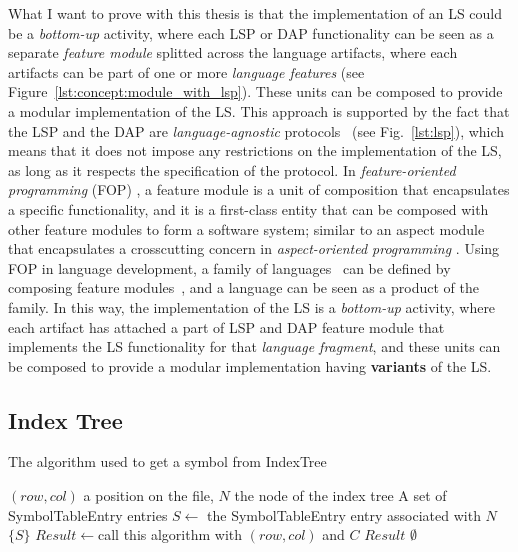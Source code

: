 What I want to prove with this thesis is that the implementation of an LS could be a \textit{bottom-up} activity, where each LSP or DAP functionality can be seen as a separate \textit{feature module} \cite{Batory04, Kastner11} splitted across the language artifacts, where each artifacts can be part of one or more \textit{language features} (see Figure~\ref{lst:concept:module_with_lsp}). These units can be composed to provide a modular implementation of the LS. This approach is supported by the fact that the LSP and the DAP are \textit{language-agnostic} protocols~\cite{Niephaus20, Rodriguez-Echeverria18} (see Fig.~\ref{lst:lsp}), which means that it does not impose any restrictions on the implementation of the LS, as long as it respects the specification of the protocol.
In \textit{feature-oriented programming} (FOP) \cite{Apel13, Czarnecki04, Prehofer01}, a feature module is a unit of composition that encapsulates a specific functionality, and it is a first-class entity that can be composed with other feature modules to form a software system; similar to an aspect module that encapsulates a crosscutting concern in \textit{aspect-oriented programming} \cite{Kiczales01, Kiczales97, Laddad03}. Using FOP in language development, a family of languages~\cite{Liebig13} can be defined by composing feature modules~\cite{Wende09}, and a language can be seen as a product of the family.
In this way, the implementation of the LS is a \textit{bottom-up} activity, where each artifact has attached a part of LSP and DAP feature module that implements the LS functionality for that \textit{language fragment}, and these units can be composed to provide a modular implementation having \textbf{variants} of the LS.

\subsection{Index Tree}\label{subsec:concept:IndexTree}

\begin{algorithm}[tbh]
    \caption{The algorithm used to get a symbol from IndexTree}\label{alg:lookup}
    \begin{algorithmic}
        \Require $(row, col)$ a position on the file, $N$ the node of the index tree
        \Ensure A set of SymbolTableEntry entries
        \State $S \gets$ the SymbolTableEntry entry associated with $N$
        \State \Return $\{S\}$
        \State $Result\gets$call this algorithm with $(row, col)$ and $C$
        \Return $Result$
        \EndIf
        \EndFor
        \Else
        \State \Return $\emptyset$
        \EndIf
    \end{algorithmic}
\end{algorithm}

